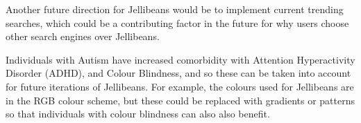\documentclass[a4paper, 11pt]{article}
\begin{document}
\vspace{5mm}
Another future direction for Jellibeans would be to implement current trending searches, which could be a contributing factor in the future for why users choose other search engines over Jellibeans. 

\vspace{5mm}
Individuals with Autism have increased comorbidity with Attention Hyperactivity Disorder (ADHD), and Colour Blindness, and so these can be taken into account for future iterations of Jellibeans. For example, the colours used for Jellibeans are in the RGB colour scheme, but these could be replaced with gradients or patterns so that individuals with colour blindness can also also benefit.



\clearpage
\begin{thebibliography}{100}


\end{thebibliography}
\end{document}
